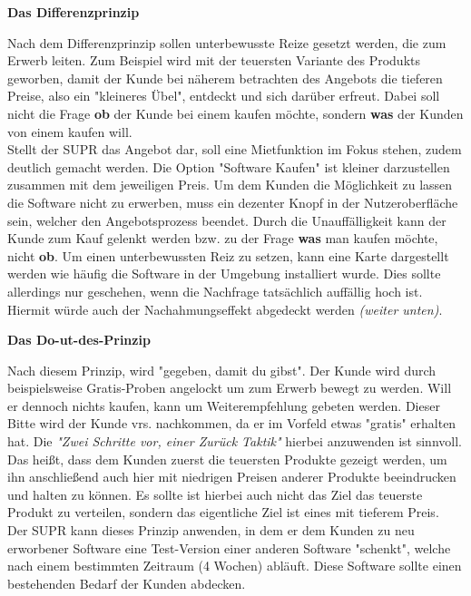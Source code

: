 \begin{large}
	\textbf{Das Differenzprinzip}\cite[S. 19fff.]{vkPsy}\\
\end{large}
Nach dem Differenzprinzip sollen unterbewusste Reize gesetzt werden, die zum Erwerb leiten. Zum Beispiel wird mit der teuersten Variante des Produkts geworben, damit der Kunde bei näherem betrachten des Angebots die tieferen Preise, also ein "kleineres Übel", entdeckt und sich darüber erfreut. Dabei soll nicht die Frage \textbf{ob} der Kunde bei einem kaufen möchte, sondern \textbf{was} der Kunden von einem kaufen will.\\
Stellt der SUPR das Angebot dar, soll eine Mietfunktion im Fokus stehen, zudem deutlich gemacht werden. Die Option "Software Kaufen" ist kleiner darzustellen zusammen mit dem jeweiligen Preis. Um dem Kunden die Möglichkeit zu lassen die Software nicht zu erwerben, muss ein dezenter Knopf in der Nutzeroberfläche sein, welcher den Angebotsprozess beendet. Durch die Unauffälligkeit kann der Kunde zum Kauf gelenkt werden bzw. zu der Frage \textbf{was} man kaufen möchte, nicht \textbf{ob}. Um einen unterbewussten Reiz zu setzen, kann eine Karte dargestellt werden wie häufig die Software in der Umgebung installiert wurde. Dies sollte allerdings nur geschehen, wenn die Nachfrage tatsächlich auffällig hoch ist. Hiermit würde auch der Nachahmungseffekt abgedeckt werden\textit{ (weiter unten)}.\\

\begin{large}
	\textbf{Das Do-ut-des-Prinzip}\cite[S. 33fff.]{vkPsy} \\
\end{large}
Nach diesem Prinzip, wird "gegeben, damit du gibst". Der Kunde wird durch beispielsweise Gratis-Proben angelockt um zum Erwerb bewegt zu werden. Will er dennoch nichts kaufen, kann um Weiterempfehlung gebeten werden. Dieser Bitte wird der Kunde vrs. nachkommen, da er im Vorfeld etwas "gratis" erhalten hat. Die \textit{"Zwei Schritte vor, einer Zurück Taktik"} hierbei anzuwenden ist sinnvoll. Das heißt, dass dem Kunden zuerst die teuersten Produkte gezeigt werden, um ihn anschließend auch hier mit niedrigen Preisen anderer Produkte beeindrucken und halten zu können. Es sollte ist hierbei auch nicht das Ziel das teuerste Produkt zu verteilen, sondern das eigentliche Ziel ist eines mit tieferem Preis.\\
Der SUPR kann dieses Prinzip anwenden, in dem er dem Kunden zu neu erworbener Software eine Test-Version einer anderen Software "schenkt", welche nach einem bestimmten Zeitraum (4 Wochen) abläuft. Diese Software sollte einen bestehenden Bedarf der Kunden abdecken.\\

